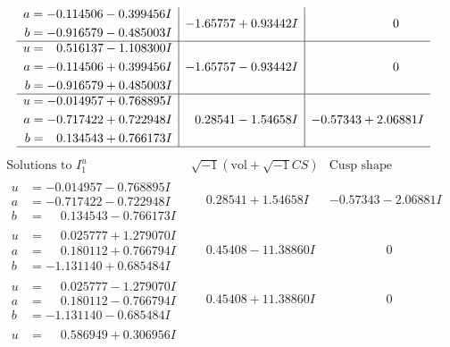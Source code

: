 \documentclass[1p]{elsarticle_modified}
\theoremstyle{definition}
\newcommand{\I}{\sqrt{-1}}
\begin{document}
$$\begin{array}{c|c|c}
\begin{aligned}
a &= -0.114506 - 0.399456 I \\
b &= -0.916579 - 0.485003 I\end{aligned}
 & -1.65757 + 0.93442 I & \phantom{-0.000000 } 0 \\ \hline\begin{aligned}
u &= \phantom{-}0.516137 - 1.108300 I \\
a &= -0.114506 + 0.399456 I \\
b &= -0.916579 + 0.485003 I\end{aligned}
 & -1.65757 - 0.93442 I & \phantom{-0.000000 } 0 \\ \hline\begin{aligned}
u &= -0.014957 + 0.768895 I \\
a &= -0.717422 + 0.722948 I \\
b &= \phantom{-}0.134543 + 0.766173 I\end{aligned}
 & \phantom{-}0.28541 - 1.54658 I & -0.57343 + 2.06881 I\\
 \hline 
 \end{array}$$\newpage$$\begin{array}{c|c|c}  
\text{Solutions to }I^u_{1}& \I (\text{vol} + \sqrt{-1}CS) & \text{Cusp shape}\\
 \hline 
\begin{aligned}
u &= -0.014957 - 0.768895 I \\
a &= -0.717422 - 0.722948 I \\
b &= \phantom{-}0.134543 - 0.766173 I\end{aligned}
 & \phantom{-}0.28541 + 1.54658 I & -0.57343 - 2.06881 I \\ \hline\begin{aligned}
u &= \phantom{-}0.025777 + 1.279070 I \\
a &= \phantom{-}0.180112 + 0.766794 I \\
b &= -1.131140 + 0.685484 I\end{aligned}
 & \phantom{-}0.45408 - 11.38860 I & \phantom{-0.000000 } 0 \\ \hline\begin{aligned}
u &= \phantom{-}0.025777 - 1.279070 I \\
a &= \phantom{-}0.180112 - 0.766794 I \\
b &= -1.131140 - 0.685484 I\end{aligned}
 & \phantom{-}0.45408 + 11.38860 I & \phantom{-0.000000 } 0 \\ \hline\begin{aligned}
u &= \phantom{-}0.586949 + 0.306956 I \\

\end{aligned}
\end{array}$$
\end{document}
